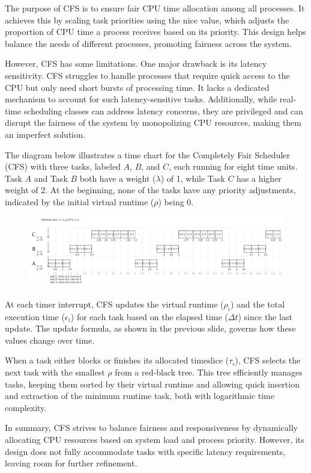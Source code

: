 The purpose of CFS is to ensure fair CPU time allocation among all processes. 
It achieves this by scaling task priorities using the nice value, which adjusts the proportion of CPU time a process receives based on its priority. 
This design helps balance the needs of different processes, promoting fairness across the system.

However, CFS has some limitations. One major drawback is its latency sensitivity. 
CFS struggles to handle processes that require quick access to the CPU but only need short bursts of processing time. 
It lacks a dedicated mechanism to account for such latency-sensitive tasks. 
Additionally, while real-time scheduling classes can address latency concerns, they are privileged and can disrupt the fairness of the system by monopolizing CPU resources, making them an imperfect solution.
\begin{example}
    The diagram below illustrates a time chart for the Completely Fair Scheduler (CFS) with three tasks, labeled $A$, $B$, and $C$, each running for eight time units. 
    Task $A$ and Task $B$ both have a weight ($\lambda$) of 1, while Task $C$ has a higher weight of 2. 
    At the beginning, none of the tasks have any priority adjustments, indicated by the initial virtual runtime ($\rho$) being 0.
    \begin{figure}[H]
        \centering
        \includegraphics[width=0.75\linewidth]{images/cfs.png}
    \end{figure}
    At each timer interrupt, CFS updates the virtual runtime ($\rho_i$) and the total execution time ($\epsilon_i$) for each task based on the elapsed time ($\Delta t$) since the last update. 
    The update formula, as shown in the previous slide, governs how these values change over time.

    When a task either blocks or finishes its allocated timeslice ($\tau_i$), CFS selects the next task with the smallest $\rho$ from a red-black tree. 
    This tree efficiently manages tasks, keeping them sorted by their virtual runtime and allowing quick insertion and extraction of the minimum runtime task, both with logarithmic time complexity.
\end{example}
In summary, CFS strives to balance fairness and responsiveness by dynamically allocating CPU resources based on system load and process priority. 
However, its design does not fully accommodate tasks with specific latency requirements, leaving room for further refinement.

